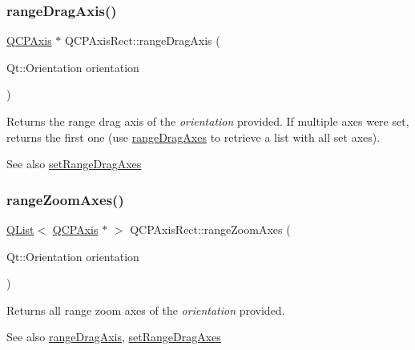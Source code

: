 \subsubsection{\texorpdfstring{range\+Drag\+Axis()}{rangeDragAxis()}}
{\footnotesize\ttfamily \hyperlink{class_q_c_p_axis}{Q\+C\+P\+Axis} $\ast$ Q\+C\+P\+Axis\+Rect\+::range\+Drag\+Axis (\begin{DoxyParamCaption}\item[{Qt\+::\+Orientation}]{orientation }\end{DoxyParamCaption})}

Returns the range drag axis of the {\itshape orientation} provided. If multiple axes were set, returns the first one (use \hyperlink{class_q_c_p_axis_rect_aae5f99a044ca911685a306f01b7ff941}{range\+Drag\+Axes} to retrieve a list with all set axes).

\begin{DoxySeeAlso}{See also}
\hyperlink{class_q_c_p_axis_rect_a648cce336bd99daac4a5ca3e5743775d}{set\+Range\+Drag\+Axes} 
\end{DoxySeeAlso}
\mbox{\label{class_q_c_p_axis_rect_a86aac0f435f209d60dacd22cda10c104}} 
\subsubsection{\texorpdfstring{range\+Zoom\+Axes()}{rangeZoomAxes()}}
{\footnotesize\ttfamily \hyperlink{class_q_list}{Q\+List}$<$ \hyperlink{class_q_c_p_axis}{Q\+C\+P\+Axis} $\ast$ $>$ Q\+C\+P\+Axis\+Rect\+::range\+Zoom\+Axes (\begin{DoxyParamCaption}\item[{Qt\+::\+Orientation}]{orientation }\end{DoxyParamCaption})}

Returns all range zoom axes of the {\itshape orientation} provided.

\begin{DoxySeeAlso}{See also}
\hyperlink{class_q_c_p_axis_rect_a6d7c22cfc54fac7a3d6ef80b133a8574}{range\+Drag\+Axis}, \hyperlink{class_q_c_p_axis_rect_a648cce336bd99daac4a5ca3e5743775d}{set\+Range\+Drag\+Axes} 
\end{DoxySeeAlso}
\mbox{\label{class_q_c_p_axis_rect_a679c63f2b8daccfe6ec5110dce3dd3b6}} 
